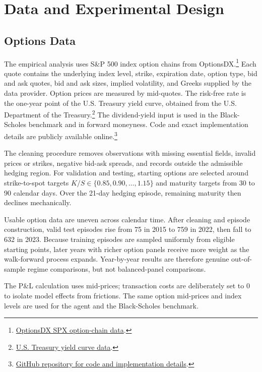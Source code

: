 \documentclass[a4paper,12pt]{article}
\numberwithin{equation}{section}
\begin{document}
\section{Data and Experimental Design}

\subsection{Options Data}
\label{sec:options_data}

The empirical analysis uses S\&P 500 index option chains from OptionsDX.\footnote{\href{https://www.optionsdx.com/product/spx-option-chain/}{OptionsDX SPX option-chain data}.} Each quote contains the underlying index level, strike, expiration date, option type, bid and ask quotes, bid and ask sizes, implied volatility, and Greeks supplied by the data provider. Option prices are measured by mid-quotes. The risk-free rate is the one-year point of the U.S. Treasury yield curve, obtained from the U.S. Department of the Treasury.\footnote{\href{https://home.treasury.gov/policy-issues/financing-the-government/interest-rate-statistics?data=yield}{U.S. Treasury yield curve data}.} The dividend-yield input is used in the Black-Scholes benchmark and in forward moneyness. Code and exact implementation details are publicly available online.\footnote{\href{https://github.com/Kirill-ZG/Interpretable-Empirical-Deep-Hedging}{GitHub repository for code and implementation details}.}

The cleaning procedure removes observations with missing essential fields, invalid prices or strikes, negative bid-ask spreads, and records outside the admissible hedging region. For validation and testing, starting options are selected around strike-to-spot targets
$K/S \in \{0.85,0.90,\ldots,1.15\}$ and maturity targets from 30 to 90 calendar days. Over the 21-day hedging episode, remaining maturity then declines mechanically.

Usable option data are uneven across calendar time. After cleaning and episode construction, valid test episodes rise from 75 in 2015 to 759 in 2022, then fall to 632 in 2023. Because training episodes are sampled uniformly from eligible starting points, later years with richer option panels receive more weight as the walk-forward process expands. Year-by-year results are therefore genuine out-of-sample regime comparisons, but not balanced-panel comparisons.

The P\&L calculation uses mid-prices; transaction costs are deliberately set to $0$ to isolate model effects from frictions. The same option mid-prices and index levels are used for the agent and the Black-Scholes benchmark.
\end{document}
